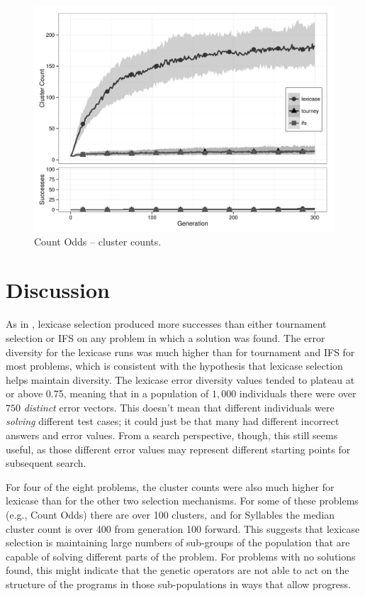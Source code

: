 \begin{figure}[p] %
\centering
\includegraphics[width=11.5cm]{count-odds-cluster.pdf}
\caption{Count Odds -- cluster counts.}
\label{count-oddsClu}
\end{figure}


\section{Discussion}
\label{sec:discussion}

As in \citep{Helmuth:2015:GECCO}, lexicase selection produced more successes than 
either tournament selection or IFS on any problem in which a solution was found. 
The error diversity for the lexicase runs was much higher than for tournament
 and IFS for most problems, which is consistent with the hypothesis that
lexicase selection helps maintain diversity. The lexicase error diversity values tended to
plateau at or above 0.75, meaning that in a population of $1,000$ individuals there were over $750$
\emph{distinct} error vectors. This doesn't mean that different individuals were \emph{solving}
different test cases; it could just be that many had different incorrect
answers and error values. From a search perspective, though, this still seems useful, as those different
error values may represent different starting points for subsequent search.

For four of the eight problems, the cluster counts were
also much higher for lexicase than for the other two selection mechanisms. For some of these problems
(e.g., Count Odds) there are over 100 clusters, and for Syllables the median cluster count is over 400
from generation 100 forward.
This suggests that lexicase selection is maintaining large numbers of sub-groups of the population that are 
capable of solving different parts of the problem. 
For problems with no solutions found, this might indicate that the genetic operators are not able to act on the structure 
of the programs in those sub-populations in ways that allow progress.

